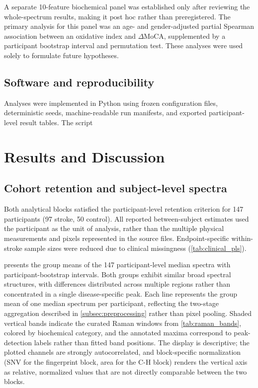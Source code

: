 \documentclass[preprint,12pt]{elsarticle}
\begin{document}
A separate 10-feature biochemical panel was established only after reviewing the whole-spectrum results, making it post hoc rather than preregistered. The primary analysis for this panel was an age- and gender-adjusted partial Spearman association between an oxidative index and $\Delta$MoCA, supplemented by a participant bootstrap interval and permutation test. These analyses were used solely to formulate future hypotheses.

\subsection{Software and reproducibility} 
\label{subsec:software}

Analyses were implemented in Python using frozen configuration files, deterministic seeds, machine-readable run manifests, and exported participant-level result tables. The script 

\section{Results and Discussion} 
\label{sec:results}

\subsection{Cohort retention and subject-level spectra} \label{subsec:spectral_profiles}

Both analytical blocks satisfied the participant-level retention criterion for 147 participants (97 stroke, 50 control). All reported between-subject estimates used the participant as the unit of analysis, rather than the multiple physical measurements and pixels represented in the source files. Endpoint-specific within-stroke sample sizes were reduced due to clinical missingness (\cref{tab:clinical_pls}).

 presents the group means of the 147 participant-level median spectra with participant-bootstrap intervals. Both groups exhibit similar broad spectral structures, with differences distributed across multiple regions rather than concentrated in a single disease-specific peak. Each line represents the group mean of one median spectrum per participant, reflecting the two-stage aggregation described in \cref{subsec:preprocessing} rather than pixel pooling. Shaded vertical bands indicate the curated Raman windows from \cref{tab:raman_bands}, colored by biochemical category, and the annotated maxima correspond to peak-detection labels rather than fitted band positions. The display is descriptive; the plotted channels are strongly autocorrelated, and block-specific normalization (SNV for the fingerprint block, area for the C-H block) renders the vertical axis as relative, normalized values that are not directly comparable between the two blocks.
\end{document}

